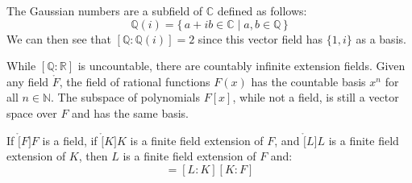     \begin{example}
        The Gaussian numbers are a subfield of $\mathbb{C}$ defined as
        follows:
        \begin{equation}
            \mathbb{Q}(i)=\{\,a+ib\in\mathbb{C}\;|\;a,b\in\mathbb{Q}\,\}
        \end{equation}
        We can then see that $[\mathbb{Q}:\mathbb{Q}(i)]=2$ since this
        vector field has $\{1,i\}$ as a basis.
    \end{example}
    \begin{example}
        While $[\mathbb{Q}:\mathbb{R}]$ is uncountable, there are countably
        infinite extension fields. Given any field $\ring{F}$, the field of
        rational functions $F(x)$ has the countable basis $x^{n}$ for all
        $n\in\mathbb{N}$. The subspace of polynomials $F[x]$, while not a
        field, is still a vector space over $F$ and has the same basis.
    \end{example}
    \begin{theorem}
        If $\ring[F]{F}$ is a field, if $\ring[K]{K}$ is a finite field
        extension of $F$, and $\ring[L]{L}$ is a finite field extension of
        $K$, then $L$ is a finite field extension of $F$ and:
        \begin{equation}
            [L:F]=[L:K][K:F]
        \end{equation}
    \end{theorem}
